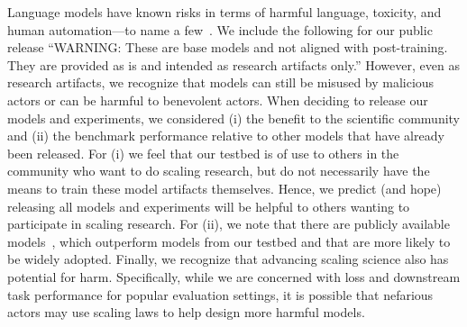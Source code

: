 \documentclass[dvipsnames,11pt]{article}
\begin{document}
\begin{appendix}
Language models have known risks in terms of harmful language, toxicity, and human automation---to name a few~\cite{weidinger2021ethical,bender2021dangers}.
We include the following for our public release ``WARNING: These are base models and not aligned with post-training. They are provided as is and intended as research artifacts only.''
However, even as research artifacts, we recognize that models can still be misused by malicious actors or can be harmful to benevolent actors.
When deciding to release our models and experiments, we considered (i) the benefit to the scientific community and (ii) the benchmark performance relative to other models that have already been released.
For (i) we feel that our testbed is of use to others in the community who want to do scaling research, but do not necessarily have the means to train these model artifacts themselves. Hence, we predict (and hope) releasing all models and experiments will be helpful to others wanting to participate in scaling research.
For (ii), we note that there are publicly available models~\cite{llama,llama2,jiang2023mistral}, which outperform models from our testbed and that are more likely to be widely adopted.
Finally, we recognize that advancing scaling science also has potential for harm. Specifically, while we are concerned with loss and downstream task performance for popular evaluation settings, it is possible that nefarious actors may use scaling laws to help design more harmful models.

\end{appendix}
\end{document}
